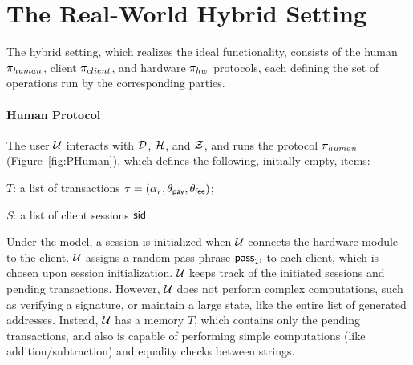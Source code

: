 \section{The Real-World Hybrid Setting}\label{sec:hybrid-protocol}

The hybrid setting, which realizes the ideal functionality, consists of the
human $\pi_{human}$, client $\pi_{client}$, and hardware $\pi_{hw}$ protocols, each defining
the set of operations run by the corresponding parties.

\paragraph{Human Protocol}\label{subsec:human-protocol}
The user $\mathcal{U}$ interacts with $\mathcal{D}$, $\mathcal{H}$, and $\mathcal{Z}$, and runs
the protocol $\pi_{human}$ (Figure~\ref{fig:PHuman}), which defines
the following, initially empty, items:
\begin{inparaenum}[i)]
    \item $T$: a list of transactions $\tau = (\alpha_r, \theta_\mathsf{pay}, \theta_\mathsf{fee})$;
    \item $S$: a list of client sessions $\mathsf{sid}$.
\end{inparaenum}
Under the model, a session is initialized when $\mathcal{U}$ connects the hardware
module to the client. $\mathcal{U}$ assigns a random pass phrase $\mathsf{pass}_{\mathcal{D}}$ to each
client, which is chosen upon session initialization. $\mathcal{U}$ keeps track of the
initiated sessions and pending transactions. However, $\mathcal{U}$ does not perform
complex computations, such as verifying a signature, or maintain a large state,
like the entire list of generated addresses. Instead, $\mathcal{U}$ has a memory $T$,
which contains only the pending transactions, and also is capable of performing
simple computations (like addition/subtraction) and equality checks between
strings.

